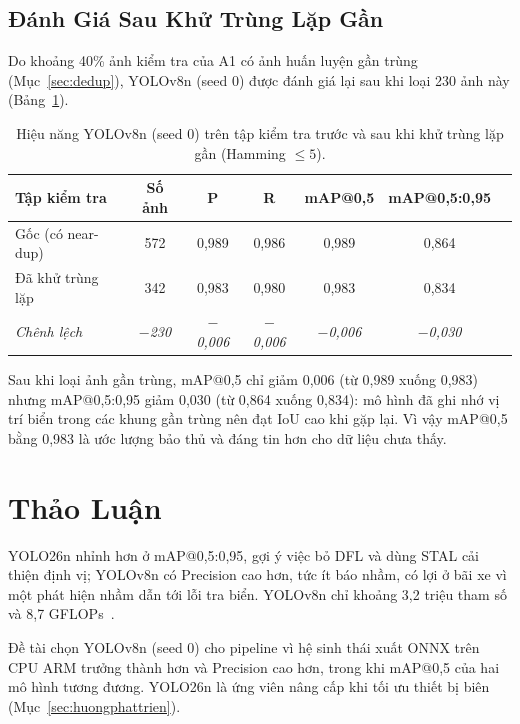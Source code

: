 \subsection{Đánh Giá Sau Khử Trùng Lặp Gần}

Do khoảng 40\% ảnh kiểm tra của A1 có ảnh huấn luyện gần trùng (Mục~\ref{sec:dedup}),
YOLOv8n (seed 0) được đánh giá lại sau khi loại 230 ảnh này (Bảng~\ref{tab:det-dedup}).

\begin{table}[htbp]
\centering
\caption{Hiệu năng YOLOv8n (seed 0) trên tập kiểm tra trước và sau khi khử trùng lặp gần (Hamming $\leq 5$).}
\label{tab:det-dedup}
\begin{tabular}{lcccccc}
\toprule
\textbf{Tập kiểm tra} & \textbf{Số ảnh} & \textbf{P} & \textbf{R} & \textbf{mAP@0,5} & \textbf{mAP@0,5:0,95} \\
\midrule
Gốc (có near-dup) & 572 & 0,989 & 0,986 & 0,989 & 0,864 \\
Đã khử trùng lặp  & 342 & 0,983 & 0,980 & 0,983 & 0,834 \\
\midrule
\textit{Chênh lệch}  & \textit{$-$230} & \textit{$-$0,006} & \textit{$-$0,006} & \textit{$-$0,006} & \textit{$-$0,030} \\
\bottomrule
\end{tabular}
\end{table}

Sau khi loại ảnh gần trùng, mAP@0,5 chỉ giảm 0,006 (từ 0,989 xuống 0,983) nhưng
mAP@0,5:0,95 giảm 0,030 (từ 0,864 xuống 0,834): mô hình đã ghi nhớ vị trí biển trong các khung
gần trùng nên đạt IoU cao khi gặp lại. Vì vậy mAP@0,5 bằng 0,983 là ước lượng bảo thủ và đáng
tin hơn cho dữ liệu chưa thấy.

\section{Thảo Luận}
\label{sec:phathien-thaoluan}

YOLO26n nhỉnh hơn ở mAP@0,5:0,95, gợi ý việc bỏ DFL và dùng STAL cải thiện định vị; YOLOv8n
có Precision cao hơn, tức ít báo nhầm, có lợi ở bãi xe vì một phát hiện nhầm dẫn tới lỗi tra
biển. YOLOv8n chỉ khoảng 3,2 triệu tham số và 8,7 GFLOPs~\autocite{jocher2023yolov8}.

Đề tài chọn YOLOv8n (seed 0) cho pipeline vì hệ sinh thái xuất ONNX trên CPU ARM trưởng thành
hơn và Precision cao hơn, trong khi mAP@0,5 của hai mô hình tương đương. YOLO26n là ứng viên
nâng cấp khi tối ưu thiết bị biên (Mục~\ref{sec:huongphattrien}).
